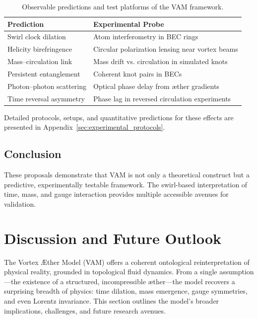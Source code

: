 \documentclass[preprint]{revtex4-2}
\begin{document}
    \begin{table}[H]
        \centering
        \begin{tabular}{|l|p{9cm}|}
            \hline
            \textbf{Prediction} & \textbf{Experimental Probe} \\
            \hline
            Swirl clock dilation & Atom interferometry in BEC rings \\
            Helicity birefringence & Circular polarization lensing near vortex beams \\
            Mass–circulation link & Mass drift vs. circulation in simulated knots \\
            Persistent entanglement & Coherent knot pairs in BECs \\
            Photon–photon scattering & Optical phase delay from æther gradients \\
            Time reversal asymmetry & Phase lag in reversed circulation experiments \\
            \hline
        \end{tabular}
        \caption{Observable predictions and test platforms of the VAM framework.}
        \label{tab:observable_tests}
    \end{table}
    Detailed protocols, setups, and quantitative predictions for these effects are presented in Appendix~\ref{sec:experimental_protocols}.

    \subsection*{Conclusion}
    These proposals demonstrate that VAM is not only a theoretical construct but a predictive, experimentally testable framework. The swirl-based interpretation of time, mass, and gauge interaction provides multiple accessible avenues for validation.


\section{Discussion and Future Outlook}
    The Vortex \AE{}ther Model (VAM) offers a coherent ontological reinterpretation of physical reality, grounded in topological fluid dynamics. From a single assumption—the existence of a structured, incompressible æther—the model recovers a surprising breadth of physics: time dilation, mass emergence, gauge symmetries, and even Lorentz invariance. This section outlines the model’s broader implications, challenges, and future research avenues.
\end{document}
